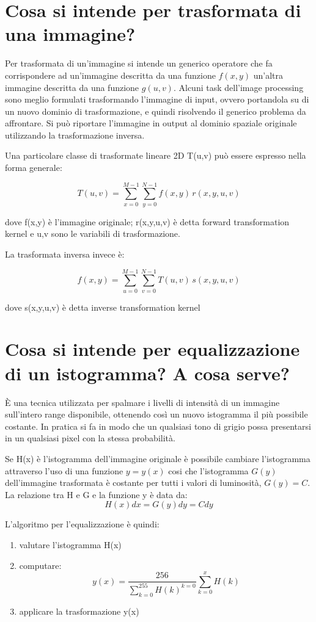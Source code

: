 \section{Cosa si intende per trasformata di una immagine?}
Per trasformata di un'immagine si intende un generico operatore che fa corrispondere ad un'immagine descritta da una funzione $f(x,y)$ un'altra immagine descritta da una funzione $g(u,v)$. Alcuni task dell'image processing sono meglio formulati trasformando l'immagine di input, ovvero portandola su di un nuovo dominio di trasformazione, e quindi risolvendo il generico problema da affrontare. Si può riportare l'immagine in output al dominio spaziale originale utilizzando la trasformazione inversa.

Una particolare classe di trasformate lineare 2D T(u,v) può essere espresso nella forma generale:

$$
T(u,v) = \sum_{x=0}^{M-1} \sum_{y=0}^{N-1} f(x,y) \, r(x, y, u, v)
$$

dove f(x,y) è l'immagine originale; r(x,y,u,v) è detta forward transformation kernel e u,v sono le variabili di trasformazione.

La trasformata inversa invece è:

$$
f(x,y) = \sum_{u=0}^{M-1} \sum_{v=0}^{N-1} T(u,v) \, s(x, y, u, v)
$$

dove s(x,y,u,v) è detta inverse transformation kernel

\section{Cosa si intende per equalizzazione di un istogramma? A cosa serve?}
È una tecnica utilizzata per spalmare i livelli di intensità di un immagine sull'intero range disponibile, ottenendo così un nuovo istogramma il più possibile costante. In pratica si fa in modo che un qualsiasi tono di grigio possa presentarsi in un qualsiasi pixel con la stessa probabilità.

Se H(x) è l'istogramma dell'immagine originale è possibile cambiare l'istogramma attraverso l'uso di una funzione $y=y(x)$ cosi che l'istogramma $G(y)$ dell'immagine trasformata è costante per tutti i valori di luminosità, $G(y) = C$. La relazione tra H e G e la funzione y è data da:
$$
H(x)dx = G(y)dy = Cdy
$$

L'algoritmo per l'equalizzazione è quindi:
\begin{enumerate}
	\item valutare l'istogramma H(x)
	\item computare:
	$$
	y(x) = \frac{256}{\sum_{k=0}^{255} H(k)^{k=0}} \sum_{k=0}^{x} H(k)
	$$
	\item applicare la trasformazione y(x)
\end{enumerate}

